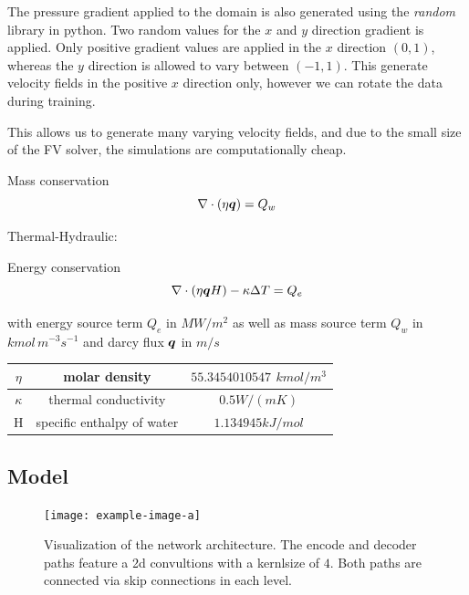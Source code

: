 \documentclass{article} %
\begin{document}
The pressure gradient applied to the domain is also generated using the \textit{random} library in python. Two random values for the $x$ and $y$ direction gradient is applied. Only positive gradient values are applied in the $x$ direction $(0 , 1)$, whereas the $y$ direction is allowed to vary between $(-1 , 1)$. This generate velocity fields in the positive $x$ direction only, however we can rotate the data during training. 

This allows us to generate many varying velocity fields, and due to the small size of the FV solver, the simulations are computationally cheap.







Mass conservation
\begin{equation}
   \label{eq:mass}
   \nabla \cdot \left(\eta {\bm{q}} \right) = Q_w
\end{equation}

Thermal-Hydraulic:

Energy conservation
\begin{equation}
   \label{eq:energy}
   \nabla \cdot \left(\eta {\bm{q}} H\right) - \kappa \Delta T = Q_e
\end{equation}

with energy source term $Q_e$ in $MW/m^2$ as well as mass source term $Q_w$ in $kmol\, m^{-3} s^{-1}$ and darcy flux ${\bm{q}}$ in $m/s$

\begin{tabular}{| c | c | c |}
   \hline
   $\eta$   & molar density        & $55.3454010547$ $kmol/m^3$ \\
   \hline
   $\kappa$ & thermal conductivity & $0.5 W/(mK)$                   \\
   \hline
   H        & specific enthalpy of water             & $1.134945 kJ/mol$                  \\
   \hline
\end{tabular}




\subsection*{Model}
\begin{figure}[htb]
   \centering
   \texttt{[image: example-image-a]}
   \caption{Visualization of the network architecture. The encode and decoder paths feature a 2d convultions with a kernlsize of $4$. Both paths are connected via skip connections in each level.}
   \label{fig:arch}
\end{figure}
\end{document}

